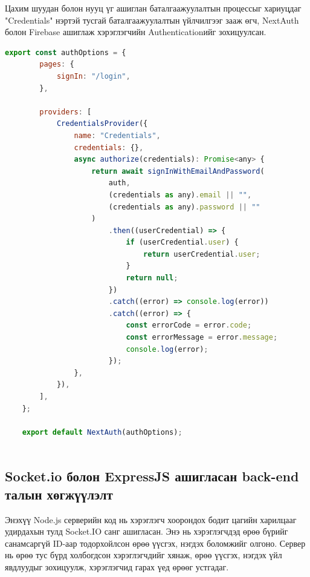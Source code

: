 Цахим шуудан болон нууц үг ашиглан баталгаажуулалтын процессыг хариуцдаг "Credentials" нэртэй тусгай баталгаажуулалтын үйлчилгээг зааж өгч, NextAuth болон Firebase ашиглаж хэрэглэгчийн Authenticationийг зохицуулсан.

\begin{lstlisting}[language=Javascript, caption= Хэрэглэгчийн Authentication болон Session-г зохицуулах, frame=single]
	export const authOptions = {
		pages: {
			signIn: "/login",
		},
	
		providers: [
			CredentialsProvider({
				name: "Credentials",
				credentials: {},
				async authorize(credentials): Promise<any> {
					return await signInWithEmailAndPassword(
						auth,
						(credentials as any).email || "",
						(credentials as any).password || ""
					)
						.then((userCredential) => {
							if (userCredential.user) {
								return userCredential.user;
							}
							return null;
						})
						.catch((error) => console.log(error))
						.catch((error) => {
							const errorCode = error.code;
							const errorMessage = error.message;
							console.log(error);
						});
				},
			}),
		],
	};
	
	export default NextAuth(authOptions);
	
\end{lstlisting}


\subsection{Socket.io болон ExpressJS ашигласан back-end талын хөгжүүлэлт}

Энэхүү Node.js серверийн код нь хэрэглэгч хоорондох бодит цагийн харилцааг удирдахын тулд Socket.IO санг ашигласан. Энэ нь хэрэглэгчдэд өрөө бүрийг санамсаргүй ID-аар тодорхойлсон өрөө үүсгэх, нэгдэх боломжийг олгоно. Сервер нь өрөө тус бүрд холбогдсон хэрэглэгчдийг хянаж, өрөө үүсгэх, нэгдэх үйл явдлуудыг зохицуулж, хэрэглэгчид гарах үед өрөөг устгадаг.

